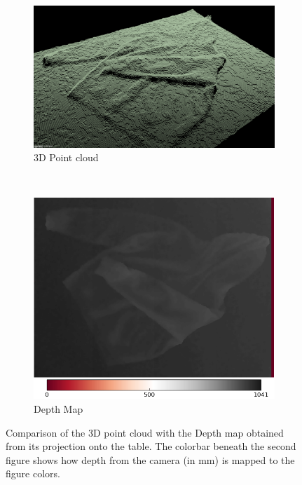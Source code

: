 \begin{figure}[htbp]
	\centering
    \begin{subfigure}[l]{0.9\textwidth}
	    \centering
    	\includegraphics[width=\textwidth]
    	{figures/point-cloud-01.png}
    	\caption{3D Point cloud}
	\end{subfigure}
	~
    \begin{subfigure}[r]{0.9\textwidth}
	    \centering
    	\includegraphics[width=\textwidth]
    	{figures/point-cloud-projection-2.png}
    	\caption{Depth Map}
	\end{subfigure}
    \caption{Comparison of the 3D point cloud with the Depth map obtained from its projection onto the table. The colorbar beneath the second figure shows how depth from the camera (in mm) is mapped to the figure colors.}
    \label{fig:point_cloud_and_depth_image}
\end{figure}


